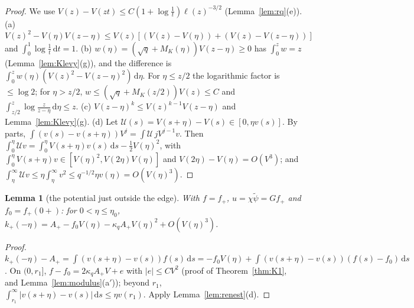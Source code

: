 \documentclass[11pt]{amsart}
\newcommand{\dd}{\,\mathrm{d}}
\newtheorem{lemma}[theorem]{Lemma}
\theoremstyle{definition}
\theoremstyle{remark}
\numberwithin{equation}{section}
\begin{document}
\begin{proof}
We use $V(z)-V(zt)\le C(1+\log\frac1t)\ell(z)^{-3/2}$ (Lemma~\ref{lem:rq}(e)). (a) $V(z)^2-V(\eta)V(z-\eta)\le V(z)[(V(z)-V(\eta))+(V(z)-V(z-\eta))]$ and $\int_0^1\log\frac1t\dd t=1$. (b) $w(\eta)=(\sqrt q+M_K(\eta))V(z-\eta)\ge0$ has $\int_0^zw=z$ (Lemma~\ref{lem:Klevy}(g)), and the difference is $\int_0^zw(\eta)(V(z)^2-V(z-\eta)^2)\dd\eta$. For $\eta\le z/2$ the logarithmic factor is $\le\log2$; for $\eta>z/2$, $w\le(\sqrt q+M_K(z/2))V(z)\le C$ and $\int_{z/2}^z\log\frac z{z-\eta}\dd\eta\le z$. (c) $V(z-\eta)^k\le V(z)^{k-1}V(z-\eta)$ and Lemma~\ref{lem:Klevy}(g). (d) Let $\mathcal U(s)=V(s+\eta)-V(s)\in[0,\eta v(s)]$. By parts, $\int(v(s)-v(s+\eta))V^j=\int\mathcal U\,jV^{j-1}v$. Then $\int_0^\eta\mathcal Uv=\int_0^\eta V(s+\eta)v(s)\dd s-\frac12V(\eta)^2$, with $\int_0^\eta V(s+\eta)v\in[V(\eta)^2,V(2\eta)V(\eta)]$ and $V(2\eta)-V(\eta)=O(V^3)$; and $\int_\eta^\infty\mathcal Uv\le\eta\int_\eta^\infty v^2\le q^{-1/2}\eta v(\eta)=O(V(\eta)^3)$.
\end{proof}

\begin{lemma}[the potential just outside the edge]\label{lem:pot}
With $f=f_+$, $u=\chi\tilde\psi=Gf_+$ and $f_0=f_+(0+)$: for $0<\eta\le\eta_0$, $k_+(-\eta)=A_+-f_0V(\eta)-\kappa_qA_+V(\eta)^2+O(V(\eta)^3)$.
\end{lemma}

\begin{proof}
$k_+(-\eta)-A_+=\int(v(s+\eta)-v(s))f(s)\dd s=-f_0V(\eta)+\int(v(s+\eta)-v(s))(f(s)-f_0)\dd s$. On $(0,r_1]$, $f-f_0=2\kappa_qA_+V+e$ with $|e|\le CV^2$ (proof of Theorem~\ref{thm:K1}, and Lemma~\ref{lem:modulus}(a$'$)); beyond $r_1$, $\int_{r_1}^\infty|v(s+\eta)-v(s)|\dd s\le\eta v(r_1)$. Apply Lemma~\ref{lem:renest}(d).
\end{proof}
\end{document}
